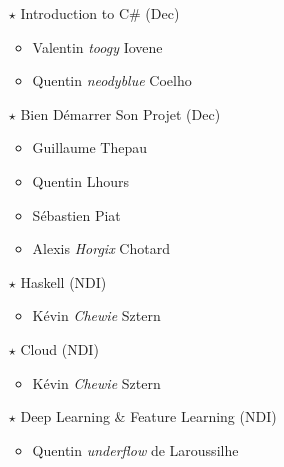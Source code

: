 \documentclass[a4paper]{article}
\begin{document}
\begin{multicols*}{2}
\begin{itemize}
            \vspace{0.3cm}

        \item[$\star$] Introduction to C\# (Dec)
            \begin{itemize}
                \item Valentin \emph{toogy} Iovene
                \item Quentin \emph{neodyblue} Coelho
            \end{itemize}

            \vspace{0.3cm}

        \item[$\star$] Bien Démarrer Son Projet (Dec)
            \begin{itemize}
                \item Guillaume Thepau
                \item Quentin Lhours
                \item Sébastien Piat
                \item Alexis \emph{Horgix} Chotard
            \end{itemize}

            \vspace{0.3cm}

        \item[$\star$] Haskell (NDI)
            \begin{itemize}
                \item Kévin \emph{Chewie} Sztern
            \end{itemize}

            \vspace{0.3cm}

        \item[$\star$] Cloud (NDI)
            \begin{itemize}
                \item Kévin \emph{Chewie} Sztern
            \end{itemize}

            \vspace{0.3cm}

        \item[$\star$] Deep Learning \& Feature Learning (NDI)
            \begin{itemize}
                \item Quentin \emph{underflow} de Laroussilhe
            \end{itemize}


\end{itemize}
\end{multicols*}
\end{document}
